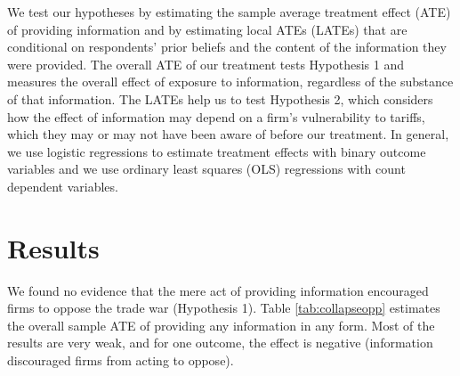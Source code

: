 \documentclass{article}
\begin{document}
We test our hypotheses by estimating the sample average treatment effect (ATE) of providing information and by estimating local ATEs (LATEs) that are conditional on respondents' prior beliefs and the content of the information they were provided. The overall ATE of our treatment tests Hypothesis 1 and measures the overall effect of exposure to information, regardless of the substance of that information. The LATEs help us to test Hypothesis 2, which considers how the effect of information may depend on a firm's vulnerability to tariffs, which they may or may not have been aware of before our treatment. In general, we use logistic regressions to estimate treatment effects with binary outcome variables and we use ordinary least squares (OLS) regressions with count dependent variables.

\section{Results}%


We found no evidence that the mere act of providing information encouraged firms to oppose the trade war (Hypothesis 1). Table \ref{tab:collapseopp} estimates the overall sample ATE of providing any information in any form. Most of the results are very weak, and for one outcome, the effect is negative (information discouraged firms from acting to oppose).


\end{document}
